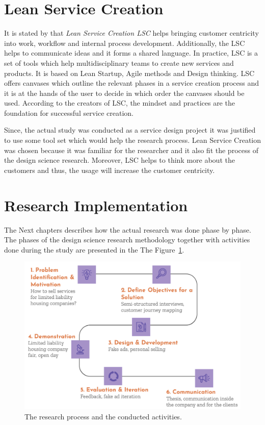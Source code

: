 \section{Lean Service Creation}

It is stated by \textcite{LSC} that \emph{Lean Service Creation LSC} helps bringing customer centricity into work, workflow and internal process development. Additionally, the LSC helps to communicate ideas and it forms a shared language. In practice, LSC is a set of tools which help multidisciplinary teams to create new services and products. It is based on Lean Startup, Agile methods and Design thinking. LSC offers canvases which outline the relevant phases in a service creation process and it is at the hands of the user to decide in which order the canvases should be used. According to the creators of LSC, the mindset and practices are the foundation for successful service creation.

Since, the actual study was conducted as a service design project it was justified to use some tool set which would help the research process. Lean Service Creation was chosen because it was familiar for the researcher and it also fit the process of the design science research. Moreover, LSC helps to think more about the customers and thus, the usage will increase the customer centricity. 


\section{Research Implementation}
\label{section:research-implementation}

The Next chapters describes how the actual research was done phase by phase. The phases of the design science research methodology together with activities done during the study are presented in the The Figure~\ref{fig:dsrm-implementation}.

\begin{figure}[ht]
  \begin{center}
    \includegraphics[width=\textwidth]{dippa/images/dsrm-implementation.png}
    \caption{The research process and the conducted activities.}
    \label{fig:dsrm-implementation}
  \end{center}
\end{figure}

